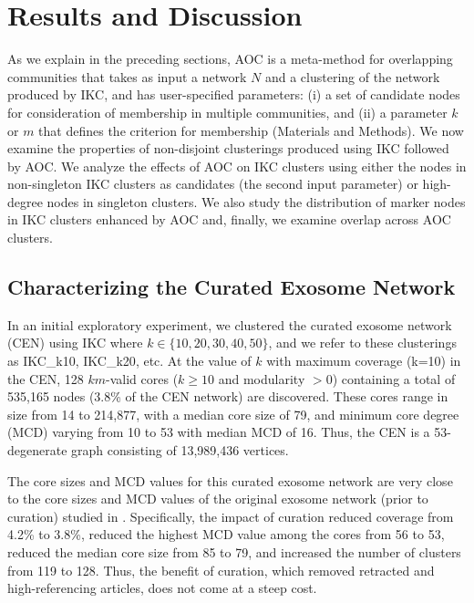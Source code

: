 \documentclass[12pt, oneside]{article}   	%
\begin{document}
\section{Results and Discussion}
	
As we explain in the preceding sections, AOC is a meta-method for overlapping communities that takes as input a network $N$ and a clustering of the network produced by IKC,  and has user-specified parameters: (i) a set of candidate nodes for consideration of membership in multiple communities, and (ii) a parameter $k$ or $m$ that defines the criterion for membership (Materials and Methods). We now examine the properties of non-disjoint clusterings produced using IKC followed by AOC. We analyze the effects of AOC on IKC clusters using either the nodes in non-singleton IKC clusters as candidates (the second input parameter) or high-degree nodes in singleton clusters. 
We also study the distribution of marker nodes in IKC clusters enhanced by AOC and, finally, we examine overlap across AOC clusters. 
	
\subsection{Characterizing the Curated Exosome Network}
 In an initial exploratory experiment, we clustered the curated exosome network (CEN) using IKC where $k \in {\{10,20,30,40, 50\}}$, and we refer to these clusterings as
 IKC\_{k10},  IKC\_{k20}, etc. 
At the value of $k$ with maximum coverage (k=10) in the CEN, 128 $km$-valid cores ($k \geq 10$ and modularity $> 0$) containing a total of 535,165 nodes (3.8\% of the CEN network) are discovered. These cores range in size from 14 to 214,877, with a median core size of 79, and minimum core degree (MCD) varying from 10 to 53 with median MCD of 16. Thus, the CEN is a 53-degenerate graph consisting of 13,989,436 vertices. 


The core sizes and MCD values for this curated exosome network are very close to the core sizes and MCD values of the original exosome network (prior to curation) studied in \cite{Wedell2022}.
Specifically, the impact of curation reduced coverage
 from 4.2\% to 3.8\%, reduced the highest MCD value among the cores from 56 to 53, reduced the median core size from 85 to 79, and increased the number of clusters  from 119 to 128.
 Thus, the benefit of curation, which removed retracted and high-referencing articles, does not come at a steep cost.
\end{document}
